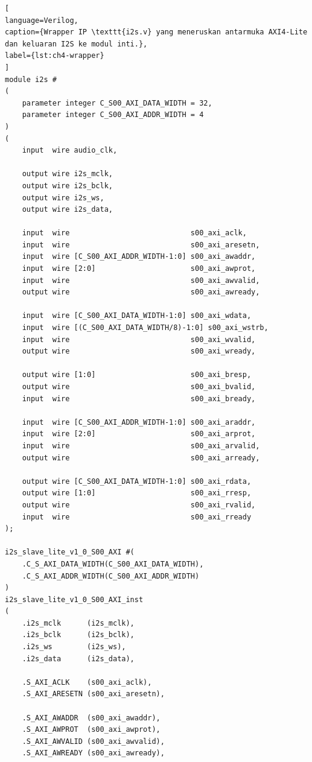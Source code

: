 \begin{lstlisting}[
language=Verilog,
caption={Wrapper IP \texttt{i2s.v} yang meneruskan antarmuka AXI4-Lite dan keluaran I2S ke modul inti.},
label={lst:ch4-wrapper}
]
module i2s #
(
    parameter integer C_S00_AXI_DATA_WIDTH = 32,
    parameter integer C_S00_AXI_ADDR_WIDTH = 4
)
(
    input  wire audio_clk,

    output wire i2s_mclk,
    output wire i2s_bclk,
    output wire i2s_ws,
    output wire i2s_data,

    input  wire                            s00_axi_aclk,
    input  wire                            s00_axi_aresetn,
    input  wire [C_S00_AXI_ADDR_WIDTH-1:0] s00_axi_awaddr,
    input  wire [2:0]                      s00_axi_awprot,
    input  wire                            s00_axi_awvalid,
    output wire                            s00_axi_awready,

    input  wire [C_S00_AXI_DATA_WIDTH-1:0] s00_axi_wdata,
    input  wire [(C_S00_AXI_DATA_WIDTH/8)-1:0] s00_axi_wstrb,
    input  wire                            s00_axi_wvalid,
    output wire                            s00_axi_wready,

    output wire [1:0]                      s00_axi_bresp,
    output wire                            s00_axi_bvalid,
    input  wire                            s00_axi_bready,

    input  wire [C_S00_AXI_ADDR_WIDTH-1:0] s00_axi_araddr,
    input  wire [2:0]                      s00_axi_arprot,
    input  wire                            s00_axi_arvalid,
    output wire                            s00_axi_arready,

    output wire [C_S00_AXI_DATA_WIDTH-1:0] s00_axi_rdata,
    output wire [1:0]                      s00_axi_rresp,
    output wire                            s00_axi_rvalid,
    input  wire                            s00_axi_rready
);

i2s_slave_lite_v1_0_S00_AXI #(
    .C_S_AXI_DATA_WIDTH(C_S00_AXI_DATA_WIDTH),
    .C_S_AXI_ADDR_WIDTH(C_S00_AXI_ADDR_WIDTH)
)
i2s_slave_lite_v1_0_S00_AXI_inst
(
    .i2s_mclk      (i2s_mclk),
    .i2s_bclk      (i2s_bclk),
    .i2s_ws        (i2s_ws),
    .i2s_data      (i2s_data),

    .S_AXI_ACLK    (s00_axi_aclk),
    .S_AXI_ARESETN (s00_axi_aresetn),

    .S_AXI_AWADDR  (s00_axi_awaddr),
    .S_AXI_AWPROT  (s00_axi_awprot),
    .S_AXI_AWVALID (s00_axi_awvalid),
    .S_AXI_AWREADY (s00_axi_awready),


\end{lstlisting}
